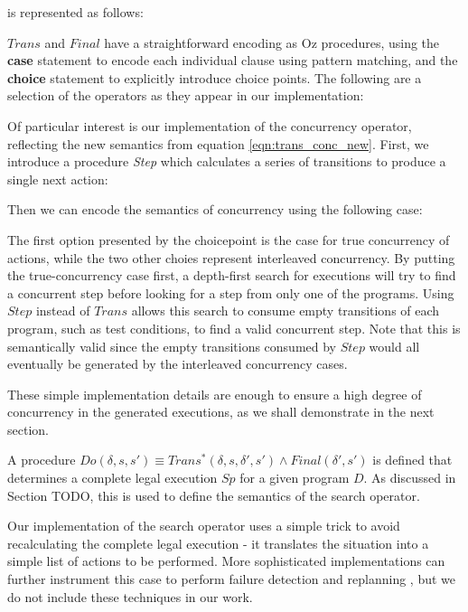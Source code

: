 is represented as follows:


$Trans$ and $Final$ have a straightforward encoding as Oz procedures,
using the \textbf{case} statement to encode each individual clause
using pattern matching, and the \textbf{choice} statement to explicitly
introduce choice points. The following are a selection of the operators
as they appear in our implementation:



Of particular interest is our implementation of the concurrency operator,
reflecting the new semantics from equation \eqref{eqn:trans_conc_new}.
First, we introduce a procedure \emph{Step} which calculates a series
of transitions to produce a single next action:


Then we can encode the semantics of concurrency using the following
case:


The first option presented by the choicepoint is the case for true
concurrency of actions, while the two other choies represent interleaved
concurrency. By putting the true-concurrency case first, a depth-first
search for executions will try to find a concurrent step before looking
for a step from only one of the programs. Using $Step$ instead of
$Trans$ allows this search to consume empty transitions of each program,
such as test conditions, to find a valid concurrent step. Note that
this is semantically valid since the empty transitions consumed by
$Step$ would all eventually be generated by the interleaved concurrency
cases.

These simple implementation details are enough to ensure a high degree
of concurrency in the generated executions, as we shall demonstrate
in the next section.

A procedure $Do(\delta,s,s')\equiv Trans^{*}(\delta,s,\delta',s')\wedge Final(\delta',s')$
is defined that determines a complete legal execution $Sp$ for a given program
$D$.  As discussed in Section TODO, this is used to define the semantics of the
search operator.


Our implementation of the search operator uses a simple trick to avoid recalculating
the complete legal execution - it translates the situation into a simple
list of actions to be performed.  More sophisticated implementations can further
instrument this case to perform failure detection and replanning \citep{Lesperance00improved_indigolog}, but we do not include these techniques in our work.

